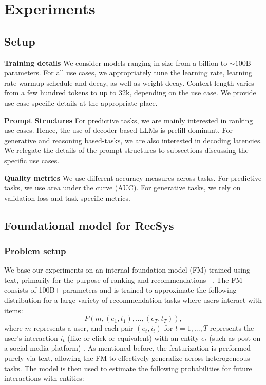 \section{Experiments}
\label{section:exp}

\subsection{Setup}

\textbf{Training details} We consider models ranging in size from a billion to $\sim 100\text{B}$ parameters. For all use cases, we appropriately tune the learning rate, learning rate warmup schedule and decay, as well as weight decay. Context length varies from a few hundred tokens to up to 32k, depending on the use case. We provide use-case specific details at the appropriate place.  


\noindent \textbf{Prompt Structures} For predictive tasks, we are mainly interested in ranking use cases. Hence, the use of decoder-based LLMs is prefill-dominant. For generative and reasoning based-tasks, we are also interested in decoding latencies. We relegate the details of the prompt structures to subsections discussing the specific use cases. 


\noindent \textbf{Quality metrics} We use different accuracy measures across tasks. For predictive tasks, we use area under the curve (AUC). For generative tasks, we rely on validation loss and task-specific metrics.






\subsection{Foundational model for RecSys}\label{subsection:recsys_task}

\subsubsection{Problem setup}

We base our experiments on an internal foundation model (FM) trained using text, primarily for the purpose of ranking and recommendations
~\cite{firooz2025360brew}. The FM consists of 100B+ parameters and is trained to approximate the following distribution for a large variety of recommendation tasks where users interact with items:  
\begin{equation}
    P (m, (e_1, t_1),...,(e_T, t_T)),
\end{equation}
where $m$ represents a user, and each pair $(e_t, i_t)$ for $t = 1, ..., T$ represents the user's interaction $i_t$ (like or click or equivalent) with an entity $e_t$ (such as post on a social media platform) . As mentioned before, the featurization is performed purely via text, allowing the FM to effectively generalize across heterogeneous tasks. The model is then used to estimate the following probabilities for future interactions with entities:


